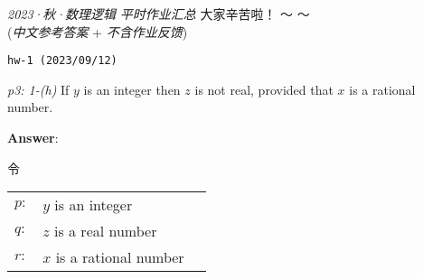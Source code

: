 \documentclass[UTF8,12pt,a4paper]{ctexart}
\begin{document}

\begin{center}
	\textit{2023·秋·数理逻辑} \qquad \textit{平时作业汇总}  \qquad 大家辛苦啦！  \faCoffee ～ ～\\
	(\textit{中文参考答案} + \textit{不含作业反馈})
\end{center}


\noindent\texttt{hw-1 (2023/09/12) }

\emph{p3: 1-(h)} \quad
If $y$ is an integer then $z$ is not real, provided that $x$ is a rational number.


\noindent\textbf{Answer}:

令
\begin{center}
	\begin{tabular}{l l l }
 $p:$ & $y$ is an integer  \\
 $q:$ & $z$ is a real number  \\
 $r:$ & $x$ is a rational number 
\end{tabular}
\end{center}
\end{document}
